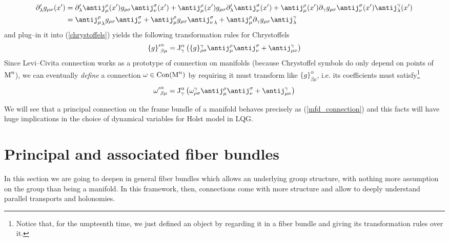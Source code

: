 \begin{align*}
    \der'_\lambda g_{\mu\nu}(x')&=\der'_\lambda\antij^\rho_\mu(x')g_{\rho\sigma}\antij^\sigma_\nu(x')+\antij^\rho_\mu(x')g_{\rho\sigma}\der'_\lambda\antij^\sigma_\nu(x')+\antij^\rho_\mu(x')\der_\gamma g_{\rho\sigma}\antij^\sigma_\nu(x')\antij^\gamma_\lambda(x')\\
    &={\antij^\rho_\mu}_\lambda g_{\rho\sigma}\antij^\sigma_\nu+{\antij^\rho_\mu}g_{\rho\sigma}{\antij^\sigma_\nu}_\lambda+\antij^\rho_\mu\der_\gamma g_{\rho\sigma}\antij^\gamma_\lambda
\end{align*}
and plug--in it into (\ref{chrystoffels}) yields the following transformation rules for Chrystoffels
$${\{g\}'}^\alpha_{\beta\mu}=\J^\alpha_\gamma\left(\{g\}^\gamma_{\rho\sigma}\antij^\rho_\mu\antij^\sigma_\nu+\antij^\gamma_{\mu\nu}\right)$$
Since Levi--Civita connection works as a prototype of connection on manifolds (because Chrystoffel symbols do only depend on points of $\text{\normalfont M}^n$), we can eventually \emph{define} a connection  $\omega\in\text{\normalfont Con}(\text{\normalfont M}^n)$ by requiring it must transform like $\{g\}^\alpha_{\beta\mu}$, i.e. its coefficients must satisfy\footnote{Notice that, for the umpteenth time, we just defined an object by regarding it in a fiber bundle and giving its transformation rules over it.}
\begin{equation}\label{mfd_connection}
    {\omega'}^\alpha_{\beta\mu}=\J^\alpha_\gamma\left(\omega^\gamma_{\rho\sigma}\antij^\rho_\mu\antij^\sigma_\nu+\antij^\gamma_{\mu\nu}\right)
\end{equation}

We will see that a principal connection on the frame bundle of a manifold behaves precisely as (\ref{mfd_connection}) and this facts will have huge implications in the choice of dynamical variables for Holst model in LQG.


\newpage
\section{Principal and associated fiber bundles}
In this section we are going to deepen in general fiber bundles which allows an underlying group structure, with nothing more assumption on the group than being a manifold. In this framework, then, connections come with more structure and allow to deeply understand parallel transports and holonomies.


